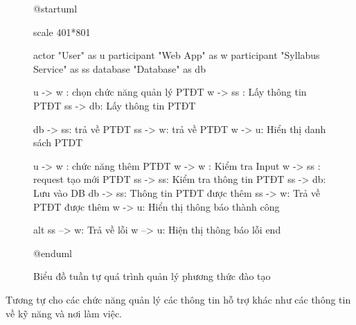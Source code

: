 \documentclass[report.tex]{subfiles}
\begin{document}
\begin{figure}[!ht]
\caption{Biểu đồ tuần tự quá trình quản lý phương thức đào tạo}
\begin{plantuml}

@startuml

scale 401*801

actor "User" as u
participant "Web App" as w
participant "Syllabus Service" as ss
database "Database" as db

u -> w : chọn chức năng quản lý PTĐT
w -> ss : Lấy thông tin PTĐT
ss -> db: Lấy thông tin PTĐT

db -> ss: trả về PTĐT
ss -> w: trả về PTĐT
w -> u: Hiển thị danh sách PTDT

u -> w : chức năng thêm PTĐT
w -> w : Kiểm tra Input
w -> ss : request tạo mới PTĐT
ss -> ss: Kiểm tra thông tin PTĐT
ss -> db: Lưu vào DB
db -> ss: Thông tin PTĐT được thêm
ss -> w: Trả về PTĐT được thêm
w -> u: Hiển thị thông báo thành công

alt
  ss --> w: Trả về lỗi
  w --> u: Hiện thị thông báo lỗi
end

@enduml
\end{plantuml}
\end{figure}
\FloatBarrier

Tương tự cho các chức năng quản lý các thông tin hỗ trợ khác như
các thông tin về kỹ năng và nơi làm việc.
\end{document}
